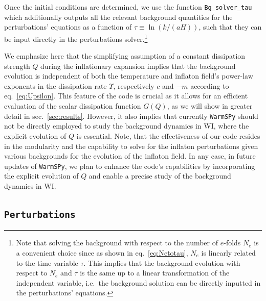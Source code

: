 \documentclass[a4paper,11pt]{article}
\begin{document}
Once the initial conditions are determined, we use the function \texttt{Bg\_solver\_tau} which additionally outputs all the relevant background quantities for the perturbations' equations as a function of $\tau \equiv \ln(k/(aH))$, such that they can be input directly in the perturbations solver.\footnote{
Note that solving the background with respect to the number of $e$-folds $N_e$ is a convenient choice since as shown in eq.~\eqref{eq:Netotau}, $N_e$ is linearly related to the time variable $\tau$. This implies that the background evolution with respect to $N_e$ and $\tau$ is the same up to a linear transformation of the independent variable, i.e.\ the background solution can be directly inputted in the perturbations' equations.
}

We emphasize here that the simplifying assumption of a constant dissipation strength $Q$ during the inflationary expansion implies that the background evolution is independent of both the temperature and inflaton field's power-law exponents in the dissipation rate $\Upsilon$, respectively $c$ and $-m$ according to eq.~\eqref{eq:Upsilon}. This feature of the code is crucial as it allows for an efficient evaluation of the scalar dissipation function $G(Q)$, as we will show in greater detail in sec.~\ref{sec:results}. However, it also implies that currently \texttt{WarmSPy} should not be directly employed to study the background dynamics in WI, where the explicit evolution of $Q$ is essential. Note, that the effectiveness of our code resides in the modularity and the capability to solve for the inflaton perturbations given various backgrounds for the evolution of the inflaton field. In any case, in future updates of \texttt{WarmSPy}, we plan to enhance the code's capabilities by incorporating the explicit evolution of $Q$ and enable a precise study of the background dynamics in WI.


\subsection{\texttt{Perturbations}}
\label{sec:perturbations_code}
\end{document}
